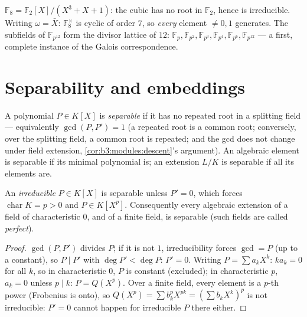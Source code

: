 \begin{example}\label{ex:b3:galois:f8}
$\mathbb F_8 = \mathbb F_2[X]/(X^3 + X + 1)$: the cubic has no
root in $\mathbb F_2$, hence is irreducible. Writing $\omega =
\bar X$: $\mathbb F_8^\times$ is cyclic of order $7$, so
\emph{every} element $\neq 0, 1$ generates. The subfields of
$\mathbb F_{p^{12}}$ form the divisor lattice of $12$:
$\mathbb F_p, \mathbb F_{p^2}, \mathbb F_{p^3}, \mathbb F_{p^4},
\mathbb F_{p^6}, \mathbb F_{p^{12}}$ --- a first, complete
instance of the Galois correspondence.
\end{example}

\section{Separability and embeddings}

\begin{definition}\label{def:b3:galois:separable}
A polynomial $P \in K[X]$ is \emph{separable} if it has no repeated root in a splitting field ---
equivalently $\gcd(P, P') = 1$ (a repeated root is a common
root; conversely, over the splitting field, a common root is
repeated; and the gcd does not change under field extension,
\cref{cor:b3:modules:descent}'s argument). An algebraic element
is separable if its minimal polynomial is; an extension $L/K$ is
separable if all its elements are.
\end{definition}

\begin{proposition}\label{prop:b3:galois:perfect}
An \emph{irreducible} $P \in K[X]$ is separable unless $P' = 0$,
which forces $\operatorname{char} K = p > 0$ and $P \in K[X^p]$.
Consequently every algebraic extension of a field of
characteristic $0$, and of a finite field, is separable (such
fields are called \emph{perfect}).
\end{proposition}

\begin{proof}
$\gcd(P, P')$ divides $P$; if it is not $1$, irreducibility
forces $\gcd = P$ (up to a constant), so $P \mid P'$ with $\deg
P' < \deg P$: $P' = 0$. Writing $P = \sum a_kX^k$: $ka_k = 0$
for all $k$, so in characteristic $0$, $P$ is constant (excluded);
in characteristic $p$, $a_k = 0$ unless $p \mid k$: $P =
Q(X^p)$. Over a finite field, every element is a $p$-th power
(Frobenius is onto), so $Q(X^p) = \sum b_k^p X^{pk} = (\sum
b_kX^k)^p$ is not irreducible: $P' = 0$ cannot happen for
irreducible $P$ there either.
\end{proof}


